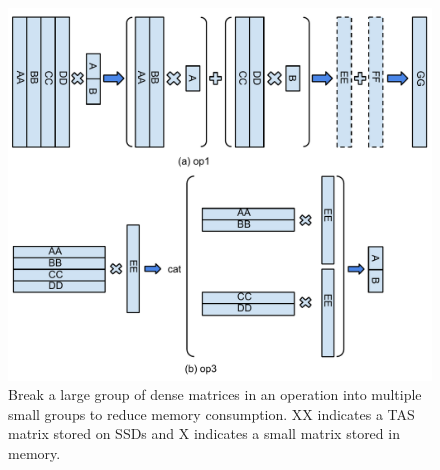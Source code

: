 \begin{figure}
\centering
\includegraphics[scale=0.4]{./mat_group.pdf}
\caption{Break a large group of dense matrices in an operation into multiple
small groups to reduce memory consumption. XX indicates a TAS matrix
stored on SSDs and X indicates a small matrix stored in memory.}
\label{fig:mat_group}
\end{figure}



